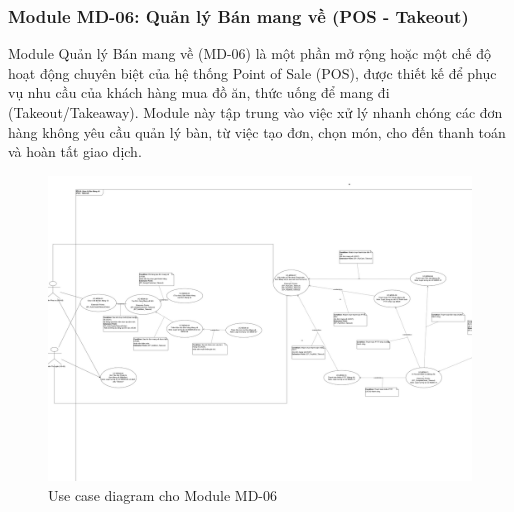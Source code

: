 \subsubsection{Module MD-06: Quản lý Bán mang về (POS - Takeout)}

Module Quản lý Bán mang về (MD-06) là một phần mở rộng hoặc một chế độ hoạt động chuyên biệt của hệ thống Point of Sale (POS), được thiết kế để phục vụ nhu cầu của khách hàng mua đồ ăn, thức uống để mang đi (Takeout/Takeaway). Module này tập trung vào việc xử lý nhanh chóng các đơn hàng không yêu cầu quản lý bàn, từ việc tạo đơn, chọn món, cho đến thanh toán và hoàn tất giao dịch.

\begin{figure}[H]
    \centering
    \includegraphics[width=15cm]{Sections/tong_quan/functional_spec/img/uc6.png}
    \vspace{0.5cm}
    \caption{Use case diagram cho Module MD-06}
    \label{fig:my_label}
\end{figure}

